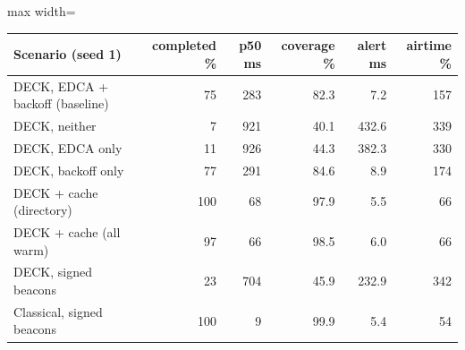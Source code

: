 \begin{adjustbox}{max width=\linewidth}
\begin{tabular}{lrrrrr}
\toprule
Scenario (seed 1) & completed \% & p50 ms & coverage \% & alert ms & airtime \% \\
\midrule
DECK, EDCA + backoff (baseline) & 75 & 283 & 82.3 & 7.2 & 157 \\
DECK, neither & 7 & 921 & 40.1 & 432.6 & 339 \\
DECK, EDCA only & 11 & 926 & 44.3 & 382.3 & 330 \\
DECK, backoff only & 77 & 291 & 84.6 & 8.9 & 174 \\
\midrule
DECK + cache (directory) & 100 & 68 & 97.9 & 5.5 & 66 \\
DECK + cache (all warm) & 97 & 66 & 98.5 & 6.0 & 66 \\
\midrule
DECK, signed beacons & 23 & 704 & 45.9 & 232.9 & 342 \\
Classical, signed beacons & 100 & 9 & 99.9 & 5.4 & 54 \\
\bottomrule
\end{tabular}
\end{adjustbox}
\par{}
